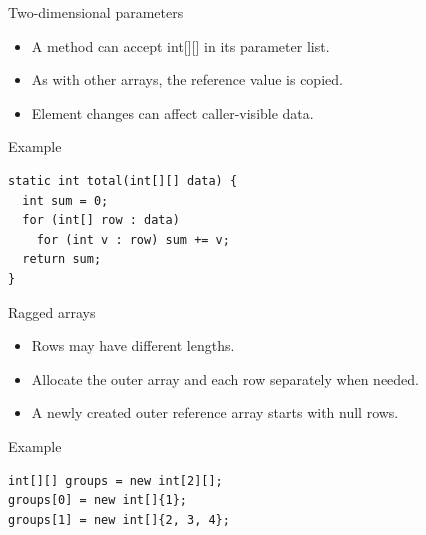 \documentclass[10pt,aspectratio=169]{beamer}
\begin{document}
\begin{frame}[fragile,t]{Two-dimensional parameters}
\begin{itemize}
\item A method can accept int[][] in its parameter list.
\item As with other arrays, the reference value is copied.
\item Element changes can affect caller-visible data.
\end{itemize}
\vspace{1mm}\begin{block}{Example}
\begin{lstlisting}
static int total(int[][] data) {
  int sum = 0;
  for (int[] row : data)
    for (int v : row) sum += v;
  return sum;
}
\end{lstlisting}
\end{block}
\end{frame}

\begin{frame}[fragile,t]{Ragged arrays}
\begin{itemize}
\item Rows may have different lengths.
\item Allocate the outer array and each row separately when needed.
\item A newly created outer reference array starts with null rows.
\end{itemize}
\vspace{1mm}\begin{block}{Example}
\begin{lstlisting}
int[][] groups = new int[2][];
groups[0] = new int[]{1};
groups[1] = new int[]{2, 3, 4};
\end{lstlisting}
\end{block}
\end{frame}
\end{document}
